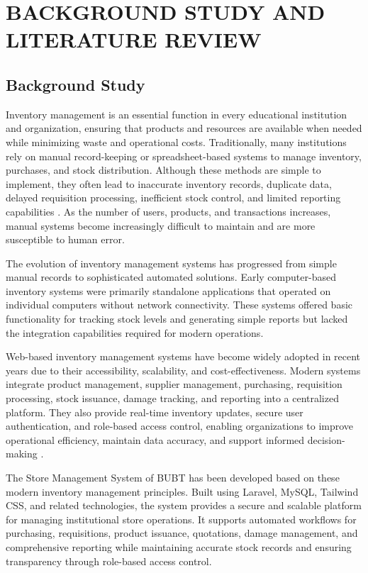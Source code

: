 \chapter{BACKGROUND STUDY AND LITERATURE REVIEW}
\label{chap:background}

\section{Background Study}

Inventory management is an essential function in every educational institution and organization, ensuring that products and resources are available when needed while minimizing waste and operational costs. Traditionally, many institutions rely on manual record-keeping or spreadsheet-based systems to manage inventory, purchases, and stock distribution. Although these methods are simple to implement, they often lead to inaccurate inventory records, duplicate data, delayed requisition processing, inefficient stock control, and limited reporting capabilities \cite{web_inventory_systems}. As the number of users, products, and transactions increases, manual systems become increasingly difficult to maintain and are more susceptible to human error.

The evolution of inventory management systems has progressed from simple manual records to sophisticated automated solutions. Early computer-based inventory systems were primarily standalone applications that operated on individual computers without network connectivity. These systems offered basic functionality for tracking stock levels and generating simple reports but lacked the integration capabilities required for modern operations.

Web-based inventory management systems have become widely adopted in recent years due to their accessibility, scalability, and cost-effectiveness. Modern systems integrate product management, supplier management, purchasing, requisition processing, stock issuance, damage tracking, and reporting into a centralized platform. They also provide real-time inventory updates, secure user authentication, and role-based access control, enabling organizations to improve operational efficiency, maintain data accuracy, and support informed decision-making \cite{laravel_inventory}.

The Store Management System of BUBT has been developed based on these modern inventory management principles. Built using Laravel, MySQL, Tailwind CSS, and related technologies, the system provides a secure and scalable platform for managing institutional store operations. It supports automated workflows for purchasing, requisitions, product issuance, quotations, damage management, and comprehensive reporting while maintaining accurate stock records and ensuring transparency through role-based access control.

